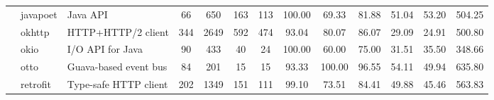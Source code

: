 \begin{table*}[]
{\begin{tabular}{lllcccccccccc}
                            & javapoet                                                      & Java API                                                                 & 66             & 650             & 163                                                              & 113            & 100.00         & 69.33          & 81.88          & 51.04                                                             & 53.20                                                              & 504.25                                               \\
                            & okhttp                                                        & HTTP+HTTP/2 client                                                       & 344            & 2649            & 592                                                              & 474            & 93.04          & 80.07          & 86.07          & 29.09                                                             & 24.91                                                              & 500.80                                               \\
                            & okio                                                          & I/O API for Java                                                         & 90             & 433             & 40                                                               & 24             & 100.00         & 60.00          & 75.00          & 31.51                                                             & 35.50                                                              & 348.66                                               \\
                            & otto                                                          & Guava-based event bus                                                    & 84             & 201             & 15                                                               & 15             & 93.33          & 100.00         & 96.55          & 54.11                                                             & 49.94                                                              & 635.80                                               \\
                            & retrofit                                                      & Type-safe HTTP client                                                    & 202            & 1349            & 151                                                              & 111            & 99.10          & 73.51          & 84.41          & 49.88                                                             & 45.46                                                              & 563.83                                               \\ \hline

\end{tabular}}
\end{table*}

